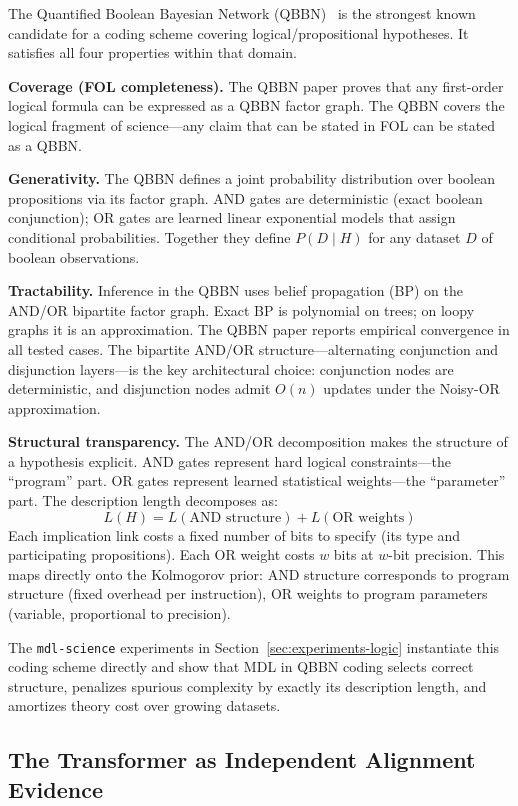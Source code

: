 The Quantified Boolean Bayesian Network
(QBBN)~\cite{coppola2024qbbn} is the strongest known candidate for a
coding scheme covering logical/propositional hypotheses. It satisfies
all four properties within that domain.

\textbf{Coverage (FOL completeness).} The QBBN paper proves that any
first-order logical formula can be expressed as a QBBN factor graph.
The QBBN covers the logical fragment of science---any claim that can
be stated in FOL can be stated as a QBBN.

\textbf{Generativity.} The QBBN defines a joint probability
distribution over boolean propositions via its factor graph. AND gates
are deterministic (exact boolean conjunction); OR gates are learned
linear exponential models that assign conditional probabilities.
Together they define $P(D \mid H)$ for any dataset $D$ of boolean
observations.

\textbf{Tractability.} Inference in the QBBN uses belief propagation
(BP) on the AND/OR bipartite factor graph. Exact BP is polynomial on
trees; on loopy graphs it is an approximation. The QBBN paper reports
empirical convergence in all tested cases. The bipartite AND/OR
structure---alternating conjunction and disjunction layers---is the
key architectural choice: conjunction nodes are deterministic, and
disjunction nodes admit $O(n)$ updates under the Noisy-OR
approximation.

\textbf{Structural transparency.} The AND/OR decomposition makes the
structure of a hypothesis explicit. AND gates represent hard logical
constraints---the ``program'' part. OR gates represent learned
statistical weights---the ``parameter'' part. The description length
decomposes as:
\[
  L(H) = L(\text{AND structure}) + L(\text{OR weights})
\]
Each implication link costs a fixed number of bits to specify (its
type and participating propositions). Each OR weight costs $w$ bits
at $w$-bit precision. This maps directly onto the Kolmogorov prior:
AND structure corresponds to program structure (fixed overhead per
instruction), OR weights to program parameters (variable, proportional
to precision).

The \texttt{mdl-science} experiments in
Section~\ref{sec:experiments-logic} instantiate this coding scheme
directly and show that MDL in QBBN coding selects correct structure,
penalizes spurious complexity by exactly its description length, and
amortizes theory cost over growing datasets.

\subsection{The Transformer as Independent Alignment Evidence}

